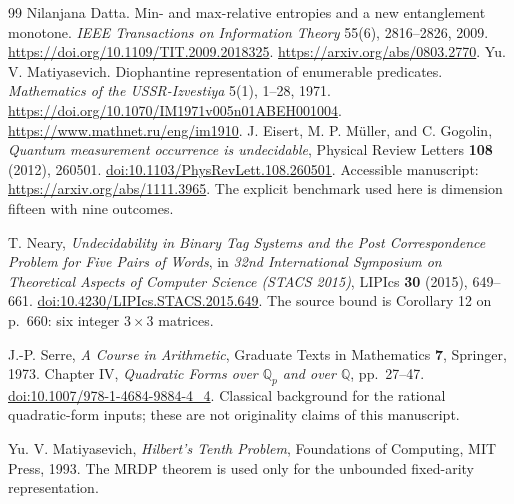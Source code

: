 \documentclass[11pt,letterpaper]{article}
\numberwithin{equation}{section}
\theoremstyle{definition}
\theoremstyle{remark}
\newcommand{\Q}{\mathbb Q}
\begin{document}
\begin{thebibliography}{99}
Nilanjana Datta.
Min- and max-relative entropies and a new entanglement monotone.
\emph{IEEE Transactions on Information Theory} 55(6), 2816--2826, 2009.
\url{https://doi.org/10.1109/TIT.2009.2018325}.
\url{https://arxiv.org/abs/0803.2770}.
Yu. V. Matiyasevich.
Diophantine representation of enumerable predicates.
\emph{Mathematics of the USSR-Izvestiya} 5(1), 1--28, 1971.
\url{https://doi.org/10.1070/IM1971v005n01ABEH001004}.
\url{https://www.mathnet.ru/eng/im1910}.
J. Eisert, M. P. M\"uller, and C. Gogolin,
\emph{Quantum measurement occurrence is undecidable},
Physical Review Letters \textbf{108} (2012), 260501.
\href{https://doi.org/10.1103/PhysRevLett.108.260501}{doi:10.1103/PhysRevLett.108.260501}.
Accessible manuscript: \url{https://arxiv.org/abs/1111.3965}.
The explicit benchmark used here is dimension fifteen with nine outcomes.

T. Neary,
\emph{Undecidability in Binary Tag Systems and the Post Correspondence Problem for Five Pairs of Words},
in \emph{32nd International Symposium on Theoretical Aspects of Computer Science (STACS 2015)},
LIPIcs \textbf{30} (2015), 649--661.
\href{https://doi.org/10.4230/LIPIcs.STACS.2015.649}{doi:10.4230/LIPIcs.STACS.2015.649}.
The source bound is Corollary 12 on p.~660: six integer $3\times3$ matrices.

J.-P. Serre,
\emph{A Course in Arithmetic},
Graduate Texts in Mathematics \textbf{7}, Springer, 1973.
Chapter IV, \emph{Quadratic Forms over $\Q_p$ and over $\Q$}, pp.~27--47.
\href{https://doi.org/10.1007/978-1-4684-9884-4_4}{doi:10.1007/978-1-4684-9884-4\_4}.
Classical background for the rational quadratic-form inputs; these are not originality claims of this manuscript.

Yu. V. Matiyasevich,
\emph{Hilbert's Tenth Problem},
Foundations of Computing, MIT Press, 1993.
The MRDP theorem is used only for the unbounded fixed-arity representation.


\end{thebibliography}
\end{document}

